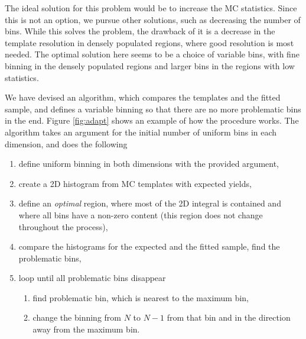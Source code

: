 The ideal solution for this problem would be to increase the MC statistics. Since this is not an option, we pursue other solutions, such as decreasing the number of bins. While this solves the problem, the drawback of it is a decrease in the template resolution in densely populated regions, where good resolution is most needed. The optimal solution here seems to be a choice of variable bins, with fine binning in the densely populated regions and larger bins in the regions with low statistics.

We have devised an algorithm, which compares the templates and the fitted sample, and defines a variable binning so that there are no more problematic bins in the end. Figure \ref{fig:adapt} shows an example of how the procedure works. The algorithm takes an argument for the initial number of uniform bins in each dimension, and does the following
\begin{enumerate}
\item define uniform binning in both dimensions with the provided argument,
\item create a 2D histogram from MC templates with expected yields,
\item define an \textit{optimal} region, where most of the 2D integral is contained and where all bins have a non-zero content (this region does not change throughout the process),
\item compare the histograms for the expected and the fitted sample, find the problematic bins,
\item loop until all problematic bins disappear
	\begin{enumerate}
	\item find problematic bin, which is nearest to the maximum bin,
	\item change the binning from $N$ to $N-1$ from that bin and in the direction away from the maximum bin.
	\end{enumerate}
\end{enumerate}

